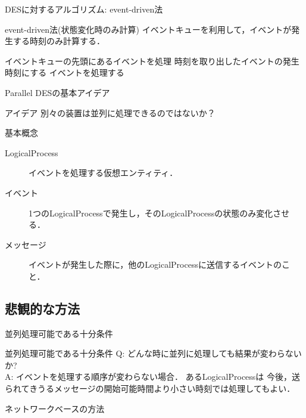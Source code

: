 \documentclass[dvipdfmx,uplatex,11pt]{beamer}
\theoremstyle{definition}
\begin{document}
\begin{frame}{DESに対するアルゴリズム: event-driven法}
  \begin{block}{event-driven法(状態変化時のみ計算)}
    イベントキューを利用して，イベントが発生する時刻のみ計算する．
    \begin{algorithmic}[1]
      \STATE イベントキューの先頭にあるイベントを処理
      \STATE 時刻を取り出したイベントの発生時刻にする
      \STATE イベントを処理する
      \ENDWHILE
    \end{algorithmic}
  \end{block}
\end{frame}

\begin{frame}{Parallel DESの基本アイデア}
  \begin{block}{アイデア}
    別々の装置は並列に処理できるのではないか？
  \end{block}
  \begin{block}{基本概念}
    \begin{description}
      \item[LogicalProcess] イベントを処理する仮想エンティティ．
      \item[イベント] 1つのLogicalProcessで発生し，そのLogicalProcessの状態のみ変化させる．
      \item[メッセージ] イベントが発生した際に，他のLogicalProcessに送信するイベントのこと．
    \end{description}
  \end{block}
\end{frame}

\subsection{悲観的な方法}

\begin{frame}{並列処理可能である十分条件}
  \begin{block}{並列処理可能である十分条件}
  Q: どんな時に並列に処理しても結果が変わらないか? \\
  A: イベントを処理する順序が変わらない場合．
     あるLogicalProcessは
     今後，送られてきうるメッセージの開始可能時間より小さい時刻では処理してもよい．
  \end{block}
\end{frame}

\begin{frame}{ネットワークベースの方法}
\end{frame}
\end{document}
